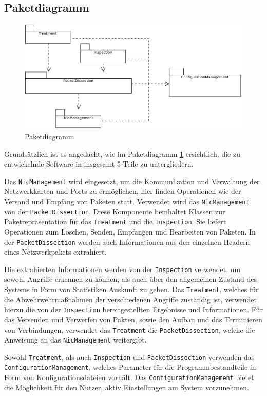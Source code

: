 \documentclass[../review_2.tex]{subfiles}
\begin{document}
\subsection{Paketdiagramm}

\begin{figure}[H]
    \centering
    \includegraphics[width=0.82\linewidth]{img/2-grobentwurf/packet_diagram.pdf}
    \caption{Paketdiagramm}
    \label{fig:dospaketdiagramm}
\end{figure}
Grundsätzlich ist es angedacht, wie im Paketdiagramm \ref{fig:dospaketdiagramm} ersichtlich, die zu entwickelnde Software in insgesamt 5 Teile zu untergliedern.

Das \texttt{NicManagement} wird eingesetzt, um die Kommunikation und Verwaltung der Netzwerkkarten und Ports zu ermöglichen, hier finden Operationen wie der Versand und Empfang von Paketen statt. Verwendet wird das \texttt{NicManagement} von der \texttt{PacketDissection}. Diese Komponente beinhaltet Klassen zur Paketrepräsentation für das \texttt{Treatment} und die \texttt{Inspection}. Sie liefert Operationen zum Löschen, Senden, Empfangen und Bearbeiten von Paketen. In der \texttt{PacketDissection} werden auch Informationen aus den einzelnen Headern eines Netzwerkpakets extrahiert.

Die extrahierten Informationen werden von der \texttt{Inspection} verwendet, um sowohl Angriffe erkennen zu können, als auch über den allgemeinen Zustand des Systems in Form von Statistiken Auskunft zu geben. Das \texttt{Treatment}, welches für die Abwehrwehrmaßnahmen der verschiedenen Angriffe zuständig ist, verwendet hierzu die von der \texttt{Inspection} bereitgestellten Ergebnisse und Informationen. Für das Versenden und Verwerfen von Pakten, sowie den Aufbau und das Terminieren von Verbindungen, verwendet das \texttt{Treatment} die \texttt{PacketDissection}, welche die Anweisung an das \texttt{NicManagement} weitergibt.

Sowohl \texttt{Treatment}, als auch \texttt{Inspection} und \texttt{PacketDissection} verwenden das \\ \texttt{ConfigurationManagement}, welches Parameter für die Programmbestandteile in Form von Konfigurationsdateien vorhält. Das \texttt{ConfigurationManagement} bietet die Möglichkeit für den Nutzer, aktiv Einstellungen am System vorzunehmen.
\end{document}
